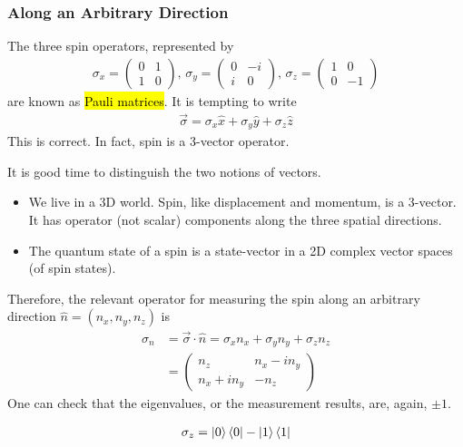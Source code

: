 \subsubsection{Along an Arbitrary Direction}
The three spin operators, represented by
\begin{align*}
    \sigma_x=\begin{pmatrix}
        0 & 1\\1 &0
    \end{pmatrix}, \, 
    \sigma_y=\begin{pmatrix}
        0 & -i \\ i & 0
    \end{pmatrix}, \, 
    \sigma_z=\begin{pmatrix}
        1 & 0 \\ 0 & -1
    \end{pmatrix}
\end{align*}
are known as \hl{Pauli matrices}.
It is tempting to write
\begin{align*}
    \vec{\sigma}=\sigma_x \hat{x}+ \sigma_y \hat{y} + \sigma_z \hat{z}
\end{align*}
This is correct. In fact, spin is a 3-vector operator.


It is good time to distinguish the two notions of vectors.
\begin{itemize}
    \item We live in a 3D world. Spin, like displacement and momentum,
    is a 3-vector. It has operator (not scalar) components along the
    three spatial directions.
    \item The quantum state of a spin is a state-vector in a 2D complex
    vector spaces (of spin states). 
\end{itemize}

Therefore, the relevant operator for measuring the spin along an arbitrary direction $\hat{n} = (n_x , n_y , n_z )$ is 
\begin{align*}
    \sigma_n&=\vec{\sigma}\cdot \hat{n}=\sigma_x n_x+ \sigma_y n_y + \sigma_z n_z\\
    &=\begin{pmatrix}
        n_z & n_x-in_y \\ n_x+in_y & -n_z
    \end{pmatrix}
\end{align*}
One can check that the eigenvalues, or the measurement results, are, again, $\pm 1$.

\begin{align*}
    \sigma_z=\ket{0}\bra{0}-\ket{1}\bra{1}
\end{align*}

